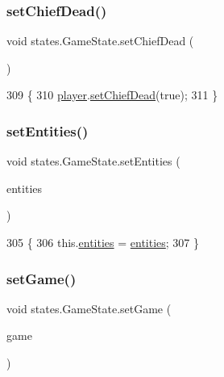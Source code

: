 \subsubsection{\texorpdfstring{set\+Chief\+Dead()}{setChiefDead()}}
{\footnotesize\ttfamily void states.\+Game\+State.\+set\+Chief\+Dead (\begin{DoxyParamCaption}{ }\end{DoxyParamCaption})\hspace{0.3cm}{\ttfamily [inline]}}


\begin{DoxyCode}
309                               \{
310         \mbox{\hyperlink{classstates_1_1_game_state_ae8ec891c55e1c5d43372a289d8a6d87e}{player}}.\mbox{\hyperlink{classentities_1_1_subject_a1f173d38d9133a93636087ff78975e90}{setChiefDead}}(\textcolor{keyword}{true});
311     \}
\end{DoxyCode}
\mbox{\label{classstates_1_1_game_state_a1bc370871445113aae1a9bff43dcc50f}} 
\subsubsection{\texorpdfstring{set\+Entities()}{setEntities()}}
{\footnotesize\ttfamily void states.\+Game\+State.\+set\+Entities (\begin{DoxyParamCaption}\item[{Array\+List$<$ \mbox{\hyperlink{classentities_1_1_subject}{Subject}} $>$}]{entities }\end{DoxyParamCaption})\hspace{0.3cm}{\ttfamily [inline]}}


\begin{DoxyCode}
305                                                          \{
306         this.\mbox{\hyperlink{namespaceentities}{entities}} = \mbox{\hyperlink{classstates_1_1_game_state_abb21bb28c6cdc15af651221a524d5073}{entities}};
307     \}
\end{DoxyCode}
\mbox{\label{classstates_1_1_game_state_a5da1739500cab675c70888ad75ec458a}} 
\subsubsection{\texorpdfstring{set\+Game()}{setGame()}}
{\footnotesize\ttfamily void states.\+Game\+State.\+set\+Game (\begin{DoxyParamCaption}\item[{\mbox{\hyperlink{classorg_1_1newdawn_1_1slick_1_1state_1_1_state_based_game}{State\+Based\+Game}}}]{game }\end{DoxyParamCaption})\hspace{0.3cm}{\ttfamily [inline]}}


